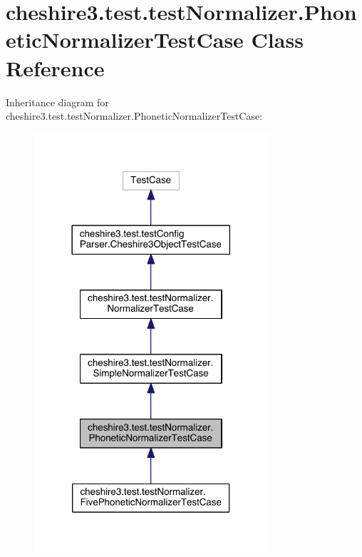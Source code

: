 \hypertarget{classcheshire3_1_1test_1_1test_normalizer_1_1_phonetic_normalizer_test_case}{\section{cheshire3.\-test.\-test\-Normalizer.\-Phonetic\-Normalizer\-Test\-Case Class Reference}
\label{classcheshire3_1_1test_1_1test_normalizer_1_1_phonetic_normalizer_test_case}
}


Inheritance diagram for cheshire3.\-test.\-test\-Normalizer.\-Phonetic\-Normalizer\-Test\-Case\-:
\nopagebreak
\begin{figure}[H]
\begin{center}
\leavevmode
\includegraphics[width=246pt]{classcheshire3_1_1test_1_1test_normalizer_1_1_phonetic_normalizer_test_case__inherit__graph}
\end{center}
\end{figure}



